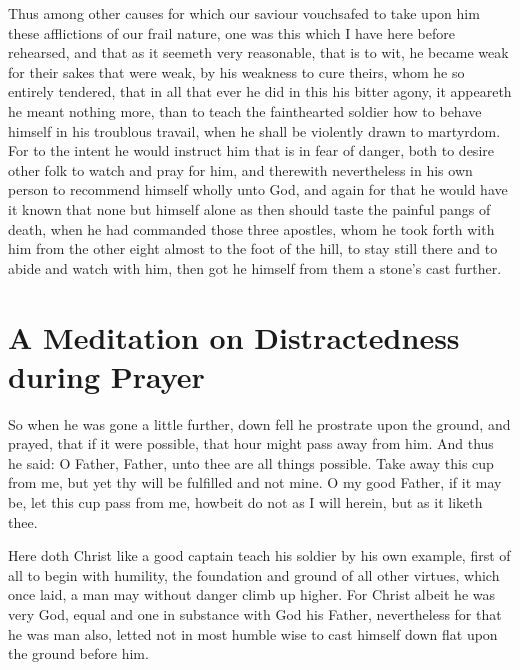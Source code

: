 \documentclass[a5paper]{scrbook}
\begin{document}
	Thus among other causes for which our saviour vouchsafed to take upon him these afflictions of our frail nature, one was this which I have here before rehearsed, and that as it seemeth very reasonable, that is to wit, he became weak for their sakes that were weak, by his weakness to cure theirs, whom he so entirely tendered, that in all that ever he did in this his bitter agony, it appeareth he meant nothing more, than to teach the fainthearted soldier how to behave himself in his troublous travail, when he shall be violently drawn to martyrdom. For to the intent he would instruct him that is in fear of danger, both to desire other folk to watch and pray for him, and therewith nevertheless in his own person to recommend himself wholly unto God, and again for that he would have it known that none but himself alone as then should taste the painful pangs of death, when he had commanded those three apostles, whom he took forth with him from the other eight almost to the foot of the hill, to stay still there and to abide and watch with him, then got he himself from them a stone's cast further.
	
	\chapter{A Meditation on Distractedness during Prayer}
	
	\begin{scripture}[Mt 26:39, Mk 14:35-36]
		So when he was gone a little further, down fell he prostrate upon the ground, and prayed, that if it were possible, that hour might pass away from him. And thus he said: O Father, Father, unto thee are all things possible. Take away this cup from me, but yet thy will be fulfilled and not mine. O my good Father, if it may be, let this cup pass from me, howbeit do not as I will herein, but as it liketh thee.
	\end{scripture}
	
	\vspace{10mm}
	
	Here doth Christ like a good captain teach his soldier by his own example, first of all to begin with humility, the foundation and ground of all other virtues, which once laid, a man may without danger climb up higher. For Christ albeit he was very God, equal and one in substance with God his Father, nevertheless for that he was man also, letted not in most humble wise to cast himself down flat
	upon the ground before him.
	
\end{document}
